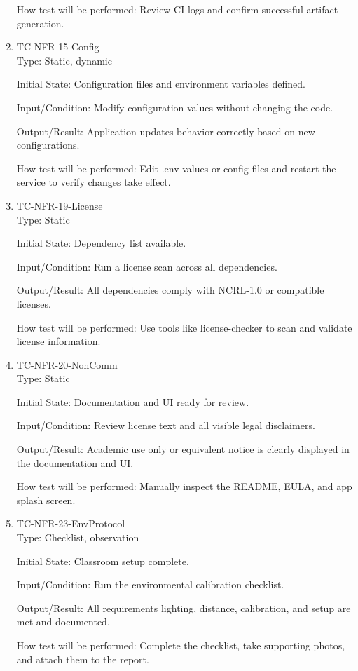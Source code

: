 \documentclass[12pt, titlepage]{article}
\begin{document}
\begin{enumerate}
How test will be performed: Review CI logs and confirm successful artifact generation.

\item{TC-NFR-15-Config\\}
Type: Static, dynamic

Initial State: Configuration files and environment variables defined.

Input/Condition: Modify configuration values without changing the code.

Output/Result: Application updates behavior correctly based on new configurations.

How test will be performed: Edit .env values or config files and restart the service to verify changes take effect.

\item{TC-NFR-19-License\\}
Type: Static

Initial State: Dependency list available.

Input/Condition: Run a license scan across all dependencies.

Output/Result: All dependencies comply with NCRL-1.0 or compatible licenses.

How test will be performed: Use tools like license-checker to scan and validate license information.

\item{TC-NFR-20-NonComm\\}
Type: Static

Initial State: Documentation and UI ready for review.

Input/Condition: Review license text and all visible legal disclaimers.

Output/Result: Academic use only or equivalent notice is clearly displayed in the documentation and UI.

How test will be performed: Manually inspect the README, EULA, and app splash screen.

\item{TC-NFR-23-EnvProtocol\\}
Type: Checklist, observation

Initial State: Classroom setup complete.

Input/Condition: Run the environmental calibration checklist.

Output/Result: All requirements lighting, distance, calibration, and setup are met and documented.

How test will be performed: Complete the checklist, take supporting photos, and attach them to the report.


\end{enumerate}
\end{document}
